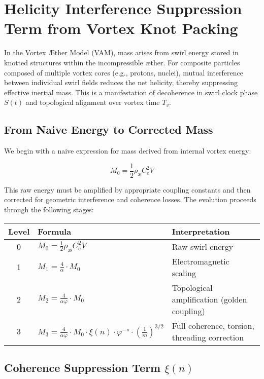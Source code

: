 \section{Helicity Interference Suppression Term from Vortex Knot Packing}

In the Vortex \AE{}ther Model (VAM), mass arises from swirl energy stored in knotted structures within the incompressible \ae{}ther. For composite particles composed of multiple vortex cores (e.g., protons, nuclei), mutual interference between individual swirl fields reduces the net helicity, thereby suppressing effective inertial mass. This is a manifestation of decoherence in swirl clock phase \( S(t) \) and topological alignment over vortex time \( T_v \).

\subsection*{From Naive Energy to Corrected Mass}

We begin with a naive expression for mass derived from internal vortex energy:

\[
M_0 = \frac{1}{2} \rho_\text{\ae} C_e^2 V
\]

This raw energy must be amplified by appropriate coupling constants and then corrected for geometric interference and coherence losses. The evolution proceeds through the following stages:

\begin{center}
\begin{tabular}{|c|l|l|}
\hline
\textbf{Level} & \textbf{Formula} & \textbf{Interpretation} \\
\hline
0 & \( M_0 = \frac{1}{2} \rho_\text{\ae} C_e^2 V \) & Raw swirl energy \\
1 & \( M_1 = \frac{4}{\alpha} \cdot M_0 \) & Electromagnetic scaling \\
2 & \( M_2 = \frac{4}{\alpha \varphi} \cdot M_0 \) & Topological amplification (golden coupling) \\
3 & \( M_3 = \frac{4}{\alpha \varphi} \cdot M_0 \cdot \xi(n) \cdot \varphi^{-s} \cdot \left( \frac{1}{m} \right)^{3/2} \) & Full coherence, torsion, threading correction \\
\hline
\end{tabular}
\end{center}

\subsection*{Coherence Suppression Term \( \xi(n) \)}

